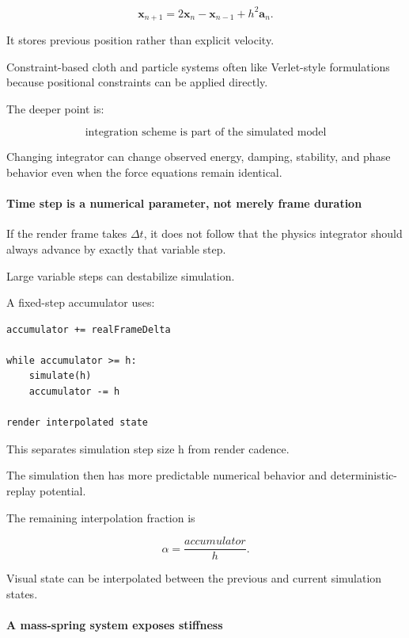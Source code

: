 \[
\mathbf x_{n+1}
=
2\mathbf x_n
-
\mathbf x_{n-1}
+
h^2\mathbf a_n.
\]

It stores previous position rather than explicit velocity.

Constraint-based cloth and particle systems often like Verlet-style formulations because positional constraints can be applied directly.

The deeper point is:

\[
\boxed{
\text{integration scheme is part of the simulated model}
}
\]

Changing integrator can change observed energy, damping, stability, and phase behavior even when the force equations remain identical.

\paragraph{Time step is a numerical parameter, not merely frame duration}\label{03-visual-computing-i-ch001-time-step-is-a-numerical-parameter-not-merely-frame-duration}

\hypertarget{03-visual-computing-i-ch001-time-step-is-a-numerical-parameter-not-merely-frame-duration}{}

If the render frame takes \(\Delta t\), it does not follow that the physics integrator should always advance by exactly that variable step.

Large variable steps can destabilize simulation.

A fixed-step accumulator uses:

\begin{verbatim}
accumulator += realFrameDelta

while accumulator >= h:
    simulate(h)
    accumulator -= h

render interpolated state
\end{verbatim}

This separates simulation step size h from render cadence.

The simulation then has more predictable numerical behavior and deterministic-replay potential.

The remaining interpolation fraction is

\[
\alpha=
\frac{accumulator}{h}.
\]

Visual state can be interpolated between the previous and current simulation states.

\paragraph{A mass-spring system exposes stiffness}\label{03-visual-computing-i-ch001-a-mass-spring-system-exposes-stiffness}

